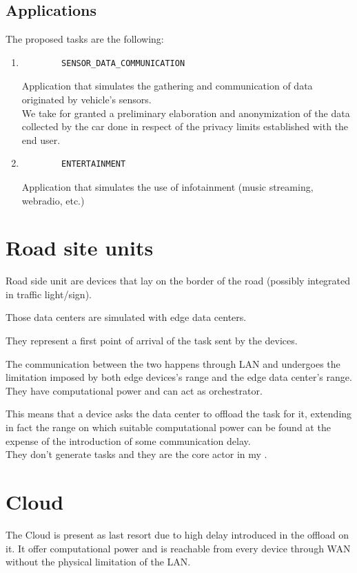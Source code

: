 \documentclass[12pt]{report}
\begin{document}
\subsection{Applications}
The proposed tasks are the following:
\begin{enumerate}
\item
	\begin{verbatim}
		SENSOR_DATA_COMMUNICATION
	\end{verbatim}
	Application that simulates the gathering and communication of data originated by vehicle's sensors.\\
	We take for granted a preliminary elaboration and anonymization of the data collected by the car done in respect of the privacy limits established with the end user.
	\item
	\begin{verbatim}
		ENTERTAINMENT
	\end{verbatim}
	Application that simulates the use of infotainment (music streaming, webradio, etc.)
\end{enumerate}

\section{Road site units}
Road side unit are devices that lay on the border of the road (possibly integrated in traffic light/sign).

Those data centers are simulated with edge data centers.

They represent a first point of arrival of the task sent by the devices.

The communication between the two happens through LAN and undergoes the limitation imposed by both edge devices's range and the edge data center's range.\\
They have computational power and can act as orchestrator.

This means that a device asks the data center to offload the task for it, extending in fact the range on which suitable computational power can be found at the expense of the introduction of some communication delay.\\
They don't generate tasks and they are the core actor in my .

\section{Cloud}
The Cloud is present as last resort due to high delay introduced in the offload on it.
It offer computational power and is reachable from every device through WAN without the physical limitation of the LAN.
\end{document}
